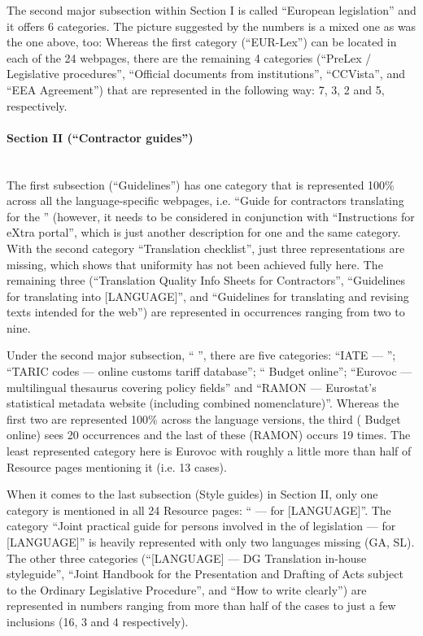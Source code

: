 \documentclass[output=paper]{langsci/langscibook}
\begin{document}
The second major subsection within Section I is called “European legislation” and it offers 6 categories. The picture suggested by the numbers is a mixed one as was the one above, too: Whereas the first category (“EUR-Lex”) can be located in each of the 24 webpages, there are the remaining 4 categories (“PreLex / Legislative procedures”, “Official documents from  institutions”, “CCVista”, and “EEA Agreement”) that are represented in the following way: 7, 3, 2 and 5, respectively. 

\paragraph*{Section II (“Contractor guides”)}~\\

The first subsection (“Guidelines”) has one category that is represented 100\% across all the language-specific webpages, i.e. “Guide for contractors translating for the ” (however, it needs to be considered in conjunction with “Instructions for eXtra portal”, which is just another description for one and the same category. With the second category “Translation checklist”, just three representations are missing, which shows that uniformity has not been achieved fully here. The remaining three (“Translation Quality Info Sheets for Contractors”, “Guidelines for translating into [LANGUAGE]”, and “Guidelines for translating and revising texts intended for the web”) are represented in occurrences ranging from two to nine.

Under the second major subsection, “ ”, there are five categories: “IATE —  ”; “TARIC codes — online customs tariff database”; “ Budget online”; “Eurovoc — multilingual thesaurus covering  policy fields” and “RAMON — Eurostat’s statistical metadata website (including combined nomenclature)”. Whereas the first two are represented 100\% across the language versions, the third ( Budget online) sees 20 occurrences and the last of these (RAMON) occurs 19 times. The least represented category here is Eurovoc with roughly a little more than half of Resource pages mentioning it (i.e. 13 cases).

When it comes to the last subsection (Style guides) in Section II, only one category is mentioned in all 24 Resource pages: “ — for [LANGUAGE]”. The category “Joint practical guide for persons involved in the  of  legislation — for [LANGUAGE]” is heavily represented with only two languages missing (GA, SL). The other three categories (“[LANGUAGE]  — DG Translation in-house styleguide”, “Joint Handbook for the Presentation and Drafting of Acts subject to the Ordinary Legislative Procedure”, and “How to write clearly”) are represented in numbers ranging from more than half of the cases to just a few inclusions (16, 3 and 4 respectively).
\end{document}
